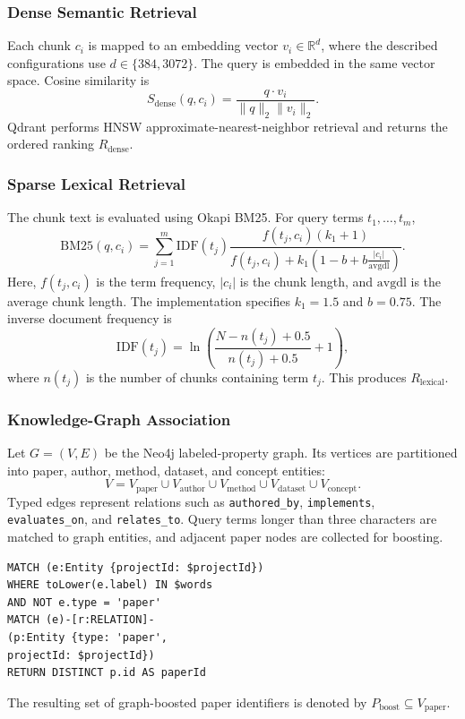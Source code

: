 \documentclass[conference]{IEEEtran}
\begin{document}
\subsubsection{Dense Semantic Retrieval}
Each chunk $c_i$ is mapped to an embedding vector $v_i\in\mathbb{R}^{d}$, where the described configurations use $d\in\{384,3072\}$. The query is embedded in the same vector space. Cosine similarity is
\begin{equation}
S_{\mathrm{dense}}(q,c_i)=
\frac{q\cdot v_i}{\lVert q\rVert_2\lVert v_i\rVert_2}.
\label{eq:cosine}
\end{equation}
Qdrant performs HNSW approximate-nearest-neighbor retrieval and returns the ordered ranking $R_{\mathrm{dense}}$.
\subsubsection{Sparse Lexical Retrieval}
The chunk text is evaluated using Okapi BM25. For query terms $t_1,\ldots,t_m$,
\begin{equation}
\mathrm{BM25}(q,c_i)=
\sum_{j=1}^{m}\mathrm{IDF}(t_j)
\frac{f(t_j,c_i)(k_1+1)}
{f(t_j,c_i)+k_1\left(1-b+b\frac{|c_i|}{\mathrm{avgdl}}\right)}.
\label{eq:bm25}
\end{equation}
Here, $f(t_j,c_i)$ is the term frequency, $|c_i|$ is the chunk length, and $\mathrm{avgdl}$ is the average chunk length. The implementation specifies $k_1=1.5$ and $b=0.75$. The inverse document frequency is
\begin{equation}
\mathrm{IDF}(t_j)=
\ln\left(
\frac{N-n(t_j)+0.5}{n(t_j)+0.5}+1
\right),
\label{eq:idf}
\end{equation}
where $n(t_j)$ is the number of chunks containing term $t_j$. This produces $R_{\mathrm{lexical}}$.
\subsubsection{Knowledge-Graph Association}
Let $G=(V,E)$ be the Neo4j labeled-property graph. Its vertices are partitioned into paper, author, method, dataset, and concept entities:
\begin{equation}
V=V_{\mathrm{paper}}\cup V_{\mathrm{author}}\cup
V_{\mathrm{method}}\cup V_{\mathrm{dataset}}\cup V_{\mathrm{concept}}.
\label{eq:vertices}
\end{equation}
Typed edges represent relations such as \texttt{authored\_by}, \texttt{implements}, \texttt{evaluates\_on}, and \texttt{relates\_to}. Query terms longer than three characters are matched to graph entities, and adjacent paper nodes are collected for boosting.
\begin{lstlisting}[language={},caption={Representative Neo4j Cypher traversal.},label={lst:cypher}]
MATCH (e:Entity {projectId: $projectId})
WHERE toLower(e.label) IN $words
AND NOT e.type = 'paper'
MATCH (e)-[r:RELATION]-
(p:Entity {type: 'paper',
projectId: $projectId})
RETURN DISTINCT p.id AS paperId
\end{lstlisting}
The resulting set of graph-boosted paper identifiers is denoted by $P_{\mathrm{boost}}\subseteq V_{\mathrm{paper}}$.
\end{document}
